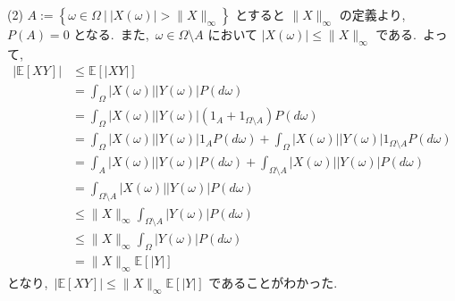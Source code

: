 \documentclass[a4j,11pt]{jarticle}
\theoremstyle{definition}
\begin{document}
(2)
$A:= \left\{\omega \in \Omega \ |\  |X(\omega)| > \|X\|_\infty \right\}$
とすると
$\|X\|_\infty$
の定義より,\ 
$P(A) = 0$
となる.\ 
また,\ 
$\omega \in \Omega \setminus A$
において
$|X(\omega)| \leq \|X\|_\infty$
である.\ 
よって,\ 
\begin{align}
  |\mathbb{E}[XY]|
  & \leq \mathbb{E}[|XY|] \\
  & = \int_{\Omega} |X(\omega)| |Y(\omega)| P(d\omega) \\
  & = \int_{\Omega} |X(\omega)| |Y(\omega)| (1_{A} + 1_{\Omega \setminus A}) P(d\omega) \\
  & = \int_{\Omega} |X(\omega)| |Y(\omega)| 1_{A} P(d\omega) + \int_{\Omega} |X(\omega)| |Y(\omega)| 1_{\Omega \setminus A} P(d\omega) \\
  & = \int_{A} |X(\omega)| |Y(\omega)| P(d\omega) + \int_{\Omega \setminus A} |X(\omega)| |Y(\omega)| P(d\omega) \\
  & = \int_{\Omega \setminus A} |X(\omega)| |Y(\omega)| P(d\omega) \\
  & \leq \|X\|_\infty \int_{\Omega \setminus A} |Y(\omega)| P(d\omega) \\
  & \leq \|X\|_\infty \int_{\Omega} |Y(\omega)| P(d\omega) \\
  & = \|X\|_\infty \mathbb{E}[|Y|]
\end{align}
となり,\ 
$|\mathbb{E}[XY]| \leq \|X\|_\infty \mathbb{E}[|Y|]$
であることがわかった.\ 
\end{document}
